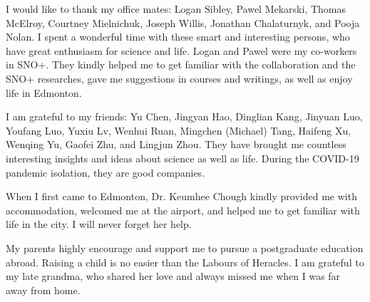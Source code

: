 I would like to thank my office mates: Logan Sibley, Pawel Mekarski, Thomas McElroy, Courtney Mielnichuk, Joseph Willis, Jonathan Chalaturnyk, and Pooja Nolan. I spent a wonderful time with these smart and interesting persons, who have great enthusiasm for science and life. Logan and Pawel were my co-workers in SNO+. They kindly helped me to get familiar with the collaboration and the SNO+ researches, gave me suggestions in courses and writings, as well as enjoy life in Edmonton.

I am grateful to my friends: Yu Chen, Jingyan Hao, Dinglian Kang, Jinyuan Luo, Youfang Luo, Yuxiu Lv, Wenhui Ruan, Mingchen (Michael) Tang, Haifeng Xu, Wenqing Yu, Gaofei Zhu, and Lingjun Zhou. They have brought me countless interesting insights and ideas about science as well as life. During the COVID-19 pandemic isolation, they are good companies.

When I first came to Edmonton, Dr. Keumhee Chough kindly provided me with accommodation, welcomed me at the airport, and helped me to get familiar with life in the city. I will never forget her help.

My parents highly encourage and support me to pursue a postgraduate education abroad. Raising a child is no easier than the Labours of Heracles. I am grateful to my late grandma, who shared her love and always missed me when I was far away from home.